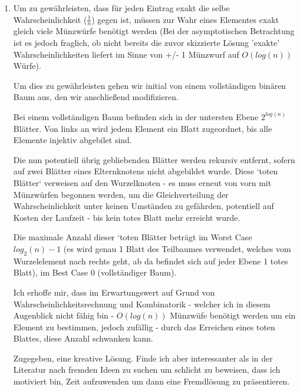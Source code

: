 \documentclass{article}
\begin{document}
\begin{enumerate}[\bfseries1.]
\begin{enumerate}
            \item  
                Um zu gewährleisten, dass für jeden Eintrag exakt die selbe
                Wahrscheinlichkeit ($\frac{1}{n}$) gegen ist, müssen zur Wahr
                eines Elementes exakt gleich viele Münzwürfe benötigt werden
                (Bei der asymptotischen Betrachtung ist es jedoch fraglich, ob
                nicht bereits die zuvor skizzierte Lösung 'exakte'
                Wahrscheinlichkeiten liefert im Sinne von +/- 1 Münzwurf auf
                $O(log(n))$ Würfe).
                
                Um dies zu gewährleisten gehen wir initial von einem
                vollständigen binären Baum aus, den wir anschließend
                modifizieren.
                
                Bei einem vollständigen Baum befinden sich in der untersten
                Ebene $2^{log(n)}$ Blätter. Von links an wird jedem Element ein
                Blatt zugeordnet, bis alle Elemente injektiv abgebilet sind.
                
                Die nun potentiell übrig gebliebenden Blätter werden rekursiv
                entfernt, sofern auf zwei Blätter eines Elternknotens nicht
                abgebildet wurde. Diese `toten Blätter` verweisen auf den
                Wurzelknoten - es muss erneut von vorn mit Münzwürfen begonnen
                werden, um die Gleichverteilung der Wahrscheinlichkeit unter
                keinen Umständen zu gefährden, potentiell auf Kosten der
                Laufzeit - bis kein totes Blatt mehr erreicht wurde.
                
                Die maximale Anzahl dieser `toten Blätter
                beträgt im Worst Case $log_2(n) - 1$ (es wird genau 1 Blatt
                des Teilbaumes verwendet, welches vom Wurzelelement nach rechts
                geht, ab da befindet sich auf jeder Ebene 1 totes Blatt), im
                Best Case 0 (vollständiger Baum).
                
                Ich erhoffe mir, dass im Erwartungswert auf Grund von
                Wahrscheinlichkeitsrechnung und Kombinatorik -  welcher ich in
                diesem Augenblick nicht fähig bin - $O(log(n))$ Münzwüfe
                benötigt werden um ein Element zu bestimmen, jedoch zufällig -
                durch das Erreichen eines toten Blattes, diese Anzahl schwanken
                kann.
                
                Zugegeben, eine kreative Lösung. Finde ich aber interessanter
                als in der Literatur nach fremden Ideen zu suchen um schlicht zu
                beweisen, dass ich motiviert bin, Zeit aufzuwenden um dann eine
                Fremdlösung zu präsentieren.


\end{enumerate}
\end{enumerate}
\end{document}
